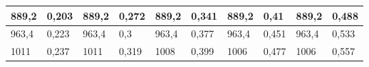 \documentclass[a4paper,12pt]{article}
\begin{document}
\begin{table}[!ht]
\begin{tabular}{|ll|ll|ll|ll|ll|}
\multicolumn{1}{|l|}{889,2}  & 0,203               & \multicolumn{1}{l|}{889,2}  & 0,272               & \multicolumn{1}{l|}{889,2}  & 0,341               & \multicolumn{1}{l|}{889,2}  & 0,41                & \multicolumn{1}{l|}{889,2}  & 0,488               \\ \hline
\multicolumn{1}{|l|}{963,4}  & 0,223               & \multicolumn{1}{l|}{963,4}  & 0,3                 & \multicolumn{1}{l|}{963,4}  & 0,377               & \multicolumn{1}{l|}{963,4}  & 0,451               & \multicolumn{1}{l|}{963,4}  & 0,533               \\ \hline
\multicolumn{1}{|l|}{1011}   & 0,237               & \multicolumn{1}{l|}{1011}   & 0,319               & \multicolumn{1}{l|}{1008}   & 0,399               & \multicolumn{1}{l|}{1006}   & 0,477               & \multicolumn{1}{l|}{1006}   & 0,557               \\ \hline
\end{tabular}
\end{table}
\end{document}

